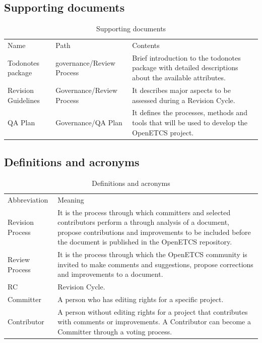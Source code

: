 \documentclass{template/openetcs_article}
\begin{document}
\subsection{Supporting documents}
\begin{table}[H]
\begin{tabular}{|m{2cm}m{3cm}m{9cm}|}
\hline
\rowcolor{myblue}
\multicolumn{3}{|c|}{Supporting documents} \\\hline
\rowcolor{lightgray}
Name &
Path &
Contents
\\\hline
Todonotes package &
governance/Review Process &
Brief introduction to the todonotes package with detailed descriptions about the available attributes. 
\\\hline
Revision Guidelines &
Governance/Review Process &
It describes major aspects to be assessed during a Revision Cycle.
\\\hline
QA Plan &
Governance/QA Plan &
It defines the processes, methods and tools that will be used to develop the OpenETCS project.
\\\hline
\end{tabular}
\caption{Supporting documents}
\end{table}

\subsection{Definitions and acronyms}
\begin{table}[H]
\begin{tabular}{|m{3cm}|m{11cm}|}
\hline
\rowcolor{myblue}
\multicolumn{2}{|c|}{Definitions and acronyms} \\\hline
\rowcolor{lightgray}
Abbreviation &
Meaning
\\\hline
Revision Process &
It is the process through which committers and selected contributors perform a through analysis of a document, propose contributions and improvements to be included before the document is published in the OpenETCS repository.
\\\hline
Review Process &
It is the process through which the OpenETCS community is invited to make comments and suggestions, propose corrections and improvements to a document.
\\\hline
RC &
Revision Cycle.
\\\hline
Committer &
A person who has editing rights for a specific project.
\\\hline
Contributor &
A person without editing rights for a project that contributes with comments or improvements. A Contributor can become a Committer through a voting process.
\\\hline
\end{tabular}
\caption{Definitions and acronyms}
\end{table}
\end{document}
